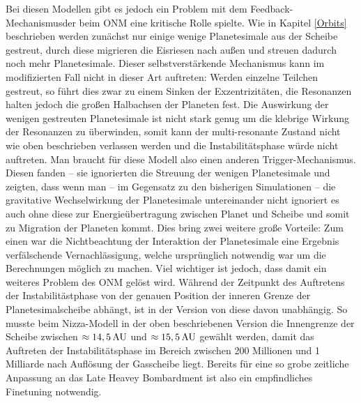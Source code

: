 \documentclass[12pt,a4paper,twoside]{article}
\renewcommand{\cite}{\citep}
\begin{document}
Bei diesen Modellen gibt es jedoch ein Problem mit dem \glqq Feedback-Mechanismus\grqq der beim ONM eine kritische Rolle spielte. Wie in Kapitel \ref{Orbits} beschrieben werden zunächst nur einige wenige Planetesimale  aus der Scheibe gestreut, durch diese migrieren die Eisriesen nach außen und streuen dadurch noch mehr Planetesimale. Dieser selbstverstärkende Mechanismus kann im modifizierten Fall nicht in dieser Art auftreten: Werden einzelne Teilchen gestreut, so führt dies zwar zu einem Sinken der Exzentrizitäten, die Resonanzen halten jedoch die großen Halbachsen der Planeten fest\cite{Levison2011}.
Die Auswirkung der wenigen gestreuten Planetesimale ist nicht stark genug um die klebrige Wirkung der Resonanzen zu überwinden, somit kann der multi-resonante Zustand nicht wie oben beschrieben verlassen werden und die Instabilitätsphase würde nicht auftreten.
Man braucht für diese Modell also einen anderen Trigger-Mechanismus. Diesen fanden \cite{Levison2011} -- sie ignorierten die Streuung der wenigen Planetesimale und zeigten, dass wenn man -- im Gegensatz zu den bisherigen Simulationen -- die gravitative Wechselwirkung der Planetesimale untereinander nicht ignoriert es auch ohne diese zur Energieübertragung zwischen Planet und Scheibe und somit zu Migration der Planeten kommt.
Dies bring zwei weitere große Vorteile:
Zum einen war die Nichtbeachtung der Interaktion der Planetesimale eine Ergebnis verfälschende Vernachlässigung, welche ursprünglich notwendig war um die Berechnungen möglich zu machen. %
Viel wichtiger ist jedoch, dass damit ein weiteres Problem des ONM gelöst wird. Während der Zeitpunkt des Auftretens der Instabilitästphase von der genauen Position der inneren Grenze der Planetesimalscheibe abhängt, ist in der Version von \cite{Morbidelli2007b, Levison2011} diese davon unabhängig.
So musste beim Nizza-Modell in der oben beschriebenen Version die Innengrenze der Scheibe zwischen $\approx\unit[14,5]{AU}$ und $\approx\unit[15,5]{AU}$ gewählt werden, damit das Auftreten der Instabilitätsphase im Bereich zwischen 200 Millionen und 1 Milliarde nach Auflösung der Gasscheibe liegt\cite{Gomes2005, Levison2011}.
Bereits für eine so grobe zeitliche Anpassung an das Late Heavey Bombardment ist also ein empfindliches Finetuning notwendig.
\end{document}
